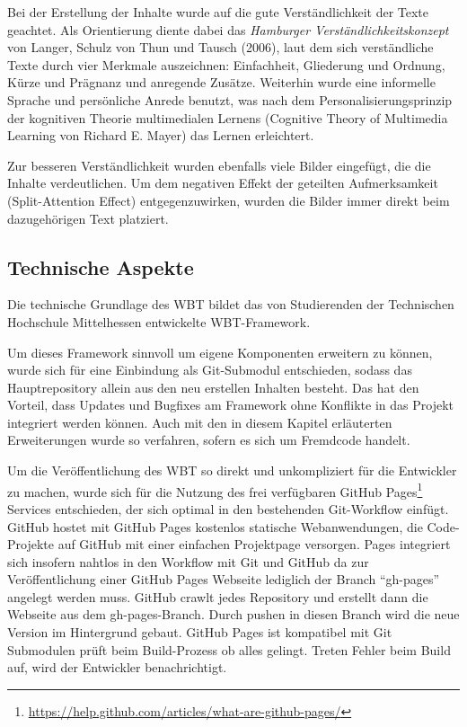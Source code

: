 \documentclass{article}
\begin{document}
Bei der Erstellung der Inhalte wurde auf die gute Verst\"and\-lichkeit der Texte geachtet. Als Orientierung diente dabei das \emph{Hamburger Verst\"andlichkeitskonzept} von Langer, Schulz von Thun und Tausch (2006)\cite{rey2009e-learning}, laut dem sich verst\"andliche Texte durch vier Merkmale auszeichnen: Einfachheit, Gliederung und Ordnung, K\"urze und Pr\"agnanz und anregende Zus\"atze. Weiterhin wurde eine informelle Sprache und pers\"onliche Anrede benutzt, was nach dem Personalisierungsprinzip der kognitiven Theorie multimedialen Lernens (Cognitive Theory of Multimedia Learning von Richard E. Mayer)\cite{rey2009e-learning} das Lernen erleichtert. 

Zur besseren Verst\"andlichkeit wurden ebenfalls viele Bilder eingef\"ugt, die die Inhalte verdeutlichen. Um dem negativen Effekt der geteilten Aufmerksamkeit (Split-Attention Effect)\cite{rey2009e-learning} entgegenzuwirken, wurden die Bilder immer direkt beim dazugeh\"origen Text platziert. 


\subsection{Technische Aspekte}
\label{ssec:tech}
Die technische Grundlage des WBT bildet das von Studierenden der Technischen Hochschule Mittelhessen entwickelte WBT-Framework.

Um dieses Framework sinnvoll um eigene Komponenten erweitern zu k\"onnen, wurde sich f\"ur eine Einbindung als Git-Submodul\cite[S. 341 ff.]{chacon2014pro} entschieden, sodass das Hauptrepository allein aus den neu erstellen Inhalten besteht. Das hat den Vorteil, dass Updates und Bugfixes am Framework ohne Konflikte in das Projekt integriert werden k\"onnen. Auch mit den in diesem Kapitel erl\"auterten Erweiterungen wurde so verfahren, sofern es sich um Fremdcode handelt.

Um die Ver\"offentlichung des WBT so direkt und unkompliziert f\"ur die Entwickler zu machen, wurde sich f\"ur die Nutzung des frei verf\"ugbaren GitHub Pages\footnote{\url{https://help.github.com/articles/what-are-github-pages/}} Services entschieden, der sich optimal in den bestehenden Git-Workflow einf\"ugt. GitHub hostet mit GitHub Pages kostenlos statische Webanwendungen, die Code-Projekte auf GitHub mit einer einfachen Projektpage versorgen. Pages integriert sich insofern nahtlos in den Workflow mit Git und GitHub da zur Ver\"offentlichung einer GitHub Pages Webseite lediglich der Branch “gh-pages” angelegt werden muss. GitHub crawlt jedes Repository und erstellt dann die Webseite aus dem gh-pages-Branch. Durch pushen in diesen Branch wird die neue Version im Hintergrund gebaut. GitHub Pages ist kompatibel mit Git Submodulen pr\"uft beim Build-Prozess ob alles gelingt. Treten Fehler beim Build auf, wird der Entwickler benachrichtigt.
\end{document}
